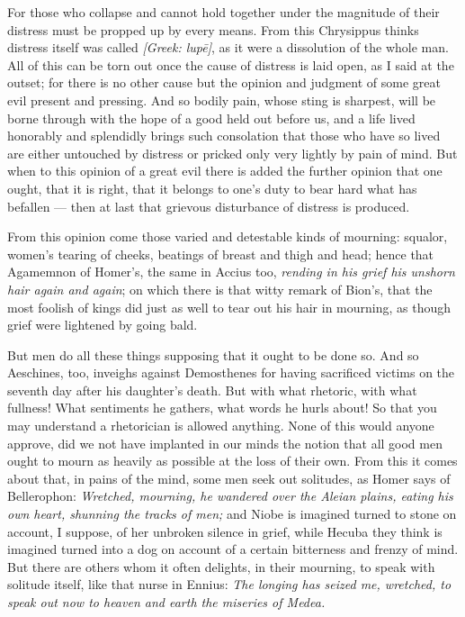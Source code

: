  For those who collapse and cannot hold together under the magnitude of their distress must be propped up by every means. From this Chrysippus thinks distress itself was called \textit{[Greek: lupē]}, as it were a dissolution of the whole man. All of this can be torn out once the cause of distress is laid open, as I said at the outset; for there is no other cause but the opinion and judgment of some great evil present and pressing. And so bodily pain, whose sting is sharpest, will be borne through with the hope of a good held out before us, and a life lived honorably and splendidly brings such consolation that those who have so lived are either untouched by distress or pricked only very lightly by pain of mind. But when to this opinion of a great evil there is added the further opinion that one ought, that it is right, that it belongs to one's duty to bear hard what has befallen — then at last that grievous disturbance of distress is produced.

 From this opinion come those varied and detestable kinds of mourning: squalor, women's tearing of cheeks, beatings of breast and thigh and head; hence that Agamemnon of Homer's, the same in Accius too, \textit{rending in his grief his unshorn hair again and again}; on which there is that witty remark of Bion's, that the most foolish of kings did just as well to tear out his hair in mourning, as though grief were lightened by going bald.

 But men do all these things supposing that it ought to be done so. And so Aeschines, too, inveighs against Demosthenes for having sacrificed victims on the seventh day after his daughter's death. But with what rhetoric, with what fullness! What sentiments he gathers, what words he hurls about! So that you may understand a rhetorician is allowed anything. None of this would anyone approve, did we not have implanted in our minds the notion that all good men ought to mourn as heavily as possible at the loss of their own. From this it comes about that, in pains of the mind, some men seek out solitudes, as Homer says of Bellerophon: \textit{Wretched, mourning, he wandered over the Aleian plains, eating his own heart, shunning the tracks of men;} and Niobe is imagined turned to stone on account, I suppose, of her unbroken silence in grief, while Hecuba they think is imagined turned into a dog on account of a certain bitterness and frenzy of mind. But there are others whom it often delights, in their mourning, to speak with solitude itself, like that nurse in Ennius: \textit{The longing has seized me, wretched, to speak out now to heaven and earth the miseries of Medea.}

